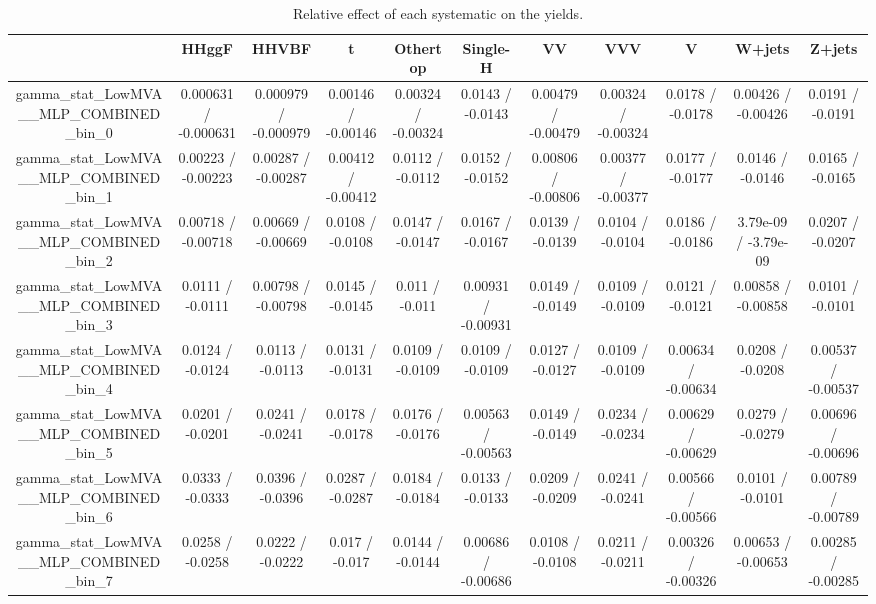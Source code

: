 \documentclass[10pt]{article}
\begin{document}
\begin{table}[htbp]
\begin{center}
\begin{tabular}{|c|c|c|c|c|c|c|c|c|c|c|}
\hline 
      & HHggF      & HHVBF      & t      & Othertop      & Single-H      & VV      & VVV      & V      & W+jets      & Z+jets \\ 
\hline 
  gamma_stat_LowMVA__MLP_COMBINED_bin_0 & 0.000631 / -0.000631 & 0.000979 / -0.000979 & 0.00146 / -0.00146 & 0.00324 / -0.00324 & 0.0143 / -0.0143 & 0.00479 / -0.00479 & 0.00324 / -0.00324 & 0.0178 / -0.0178 & 0.00426 / -0.00426 & 0.0191 / -0.0191 \\ 
  gamma_stat_LowMVA__MLP_COMBINED_bin_1 & 0.00223 / -0.00223 & 0.00287 / -0.00287 & 0.00412 / -0.00412 & 0.0112 / -0.0112 & 0.0152 / -0.0152 & 0.00806 / -0.00806 & 0.00377 / -0.00377 & 0.0177 / -0.0177 & 0.0146 / -0.0146 & 0.0165 / -0.0165 \\ 
  gamma_stat_LowMVA__MLP_COMBINED_bin_2 & 0.00718 / -0.00718 & 0.00669 / -0.00669 & 0.0108 / -0.0108 & 0.0147 / -0.0147 & 0.0167 / -0.0167 & 0.0139 / -0.0139 & 0.0104 / -0.0104 & 0.0186 / -0.0186 & 3.79e-09 / -3.79e-09 & 0.0207 / -0.0207 \\ 
  gamma_stat_LowMVA__MLP_COMBINED_bin_3 & 0.0111 / -0.0111 & 0.00798 / -0.00798 & 0.0145 / -0.0145 & 0.011 / -0.011 & 0.00931 / -0.00931 & 0.0149 / -0.0149 & 0.0109 / -0.0109 & 0.0121 / -0.0121 & 0.00858 / -0.00858 & 0.0101 / -0.0101 \\ 
  gamma_stat_LowMVA__MLP_COMBINED_bin_4 & 0.0124 / -0.0124 & 0.0113 / -0.0113 & 0.0131 / -0.0131 & 0.0109 / -0.0109 & 0.0109 / -0.0109 & 0.0127 / -0.0127 & 0.0109 / -0.0109 & 0.00634 / -0.00634 & 0.0208 / -0.0208 & 0.00537 / -0.00537 \\ 
  gamma_stat_LowMVA__MLP_COMBINED_bin_5 & 0.0201 / -0.0201 & 0.0241 / -0.0241 & 0.0178 / -0.0178 & 0.0176 / -0.0176 & 0.00563 / -0.00563 & 0.0149 / -0.0149 & 0.0234 / -0.0234 & 0.00629 / -0.00629 & 0.0279 / -0.0279 & 0.00696 / -0.00696 \\ 
  gamma_stat_LowMVA__MLP_COMBINED_bin_6 & 0.0333 / -0.0333 & 0.0396 / -0.0396 & 0.0287 / -0.0287 & 0.0184 / -0.0184 & 0.0133 / -0.0133 & 0.0209 / -0.0209 & 0.0241 / -0.0241 & 0.00566 / -0.00566 & 0.0101 / -0.0101 & 0.00789 / -0.00789 \\ 
  gamma_stat_LowMVA__MLP_COMBINED_bin_7 & 0.0258 / -0.0258 & 0.0222 / -0.0222 & 0.017 / -0.017 & 0.0144 / -0.0144 & 0.00686 / -0.00686 & 0.0108 / -0.0108 & 0.0211 / -0.0211 & 0.00326 / -0.00326 & 0.00653 / -0.00653 & 0.00285 / -0.00285 \\ 
\hline 
\end{tabular} 
\caption{Relative effect of each systematic on the yields.} 
\end{center} 
\end{table} 
\end{document}
